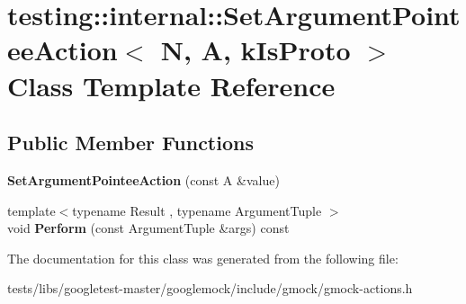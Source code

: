 \hypertarget{classtesting_1_1internal_1_1SetArgumentPointeeAction}{}\section{testing\+:\+:internal\+:\+:Set\+Argument\+Pointee\+Action$<$ N, A, k\+Is\+Proto $>$ Class Template Reference}
\label{classtesting_1_1internal_1_1SetArgumentPointeeAction}
\subsection*{Public Member Functions}
\begin{DoxyCompactItemize}
\item 
\mbox{\label{classtesting_1_1internal_1_1SetArgumentPointeeAction_a5a4119ed113667bd4a003ab0bec2cdff}} 
{\bfseries Set\+Argument\+Pointee\+Action} (const A \&value)
\item 
\mbox{\label{classtesting_1_1internal_1_1SetArgumentPointeeAction_a128320dcf991ff7f1a0087dab38b4014}} 
{\footnotesize template$<$typename Result , typename Argument\+Tuple $>$ }\\void {\bfseries Perform} (const Argument\+Tuple \&args) const
\end{DoxyCompactItemize}


The documentation for this class was generated from the following file\+:\begin{DoxyCompactItemize}
\item 
tests/libs/googletest-\/master/googlemock/include/gmock/gmock-\/actions.\+h\end{DoxyCompactItemize}
